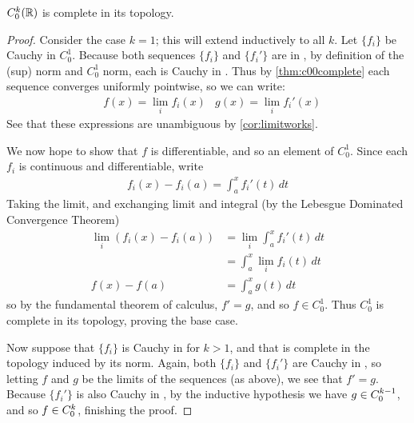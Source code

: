       \begin{thm}
        \label{thm:ck0complete}
        ${C^k_0}(\mathbb{R})$ is complete in its topology.
      \end{thm}
      \begin{proof}
        Consider the case $k=1$; this will extend inductively to all $k$.
        Let $\{f_i\}$ be Cauchy in $C^1_0$.
        Because both sequences $\{f_i\}$ and $\{f_i'\}$ are in \Coo, by definition of the \Coo (sup) norm and $C^1_0$ norm, each is Cauchy in \Coo.
        Thus by \cref{thm:c00complete} each sequence converges uniformly pointwise, so we can write:
        \begin{align*}
          &f(x)=\lim_i f_i(x) &g(x)=\lim_i f_i'(x)
        \end{align*}
        See that these expressions are unambiguous by \cref{cor:limitworks}.

        We now hope to show that $f$ is differentiable, and so an element of $C^1_0$.
        Since each $f_i$ is continuous and differentiable, write
        \begin{align*}
          f_i(x)-f_i(a) = \int_a^x f_i'(t)\,dt
        \end{align*}
        Taking the limit, and exchanging limit and integral (by the Lebesgue Dominated Convergence Theorem)
        \begin{align*}
          \lim_i \left( f_i(x)-f_i(a) \right) &= \lim_i\int_a^x f_i'(t)\,dt\\
          &= \int_a^x\lim_if_i(t)\,dt\\
          f(x)-f(a) &= \int_a^x g(t)\,dt
        \end{align*}
        so by the fundamental theorem of calculus, $f'=g$, and so $f\in C^1_0$.
        Thus $C^1_0$ is complete in its topology, proving the base case.

        Now suppose that $\{f_i\}$ is Cauchy in \Cko for $k>1$, and that \Ckmo is complete in the topology induced by its norm.
        Again, both $\{f_i\}$ and $\{f_i'\}$ are Cauchy in \Coo, so letting $f$ and $g$ be the limits of the sequences (as above), we see that $f'=g$.
        Because $\{f_i'\}$ is also Cauchy in \Ckmo, by the inductive hypothesis we have $g\in{C^{k-1}_0}$, and so $f\in{C^k_0}$, finishing the proof.
      \end{proof}


